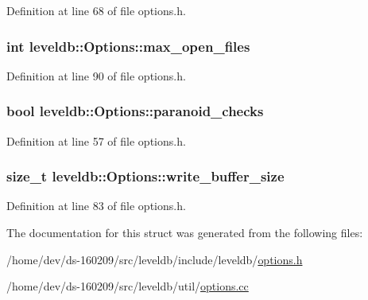 Definition at line 68 of file options.\+h.

\hypertarget{structleveldb_1_1_options_a25c6ea125fc63342d8fc25b2f7817be4}{}
\subsubsection[{max\+\_\+open\+\_\+files}]{\setlength{\rightskip}{0pt plus 5cm}int leveldb\+::\+Options\+::max\+\_\+open\+\_\+files}\label{structleveldb_1_1_options_a25c6ea125fc63342d8fc25b2f7817be4}


Definition at line 90 of file options.\+h.

\hypertarget{structleveldb_1_1_options_a4263dcc655493100eecc9daf6737a10b}{}
\subsubsection[{paranoid\+\_\+checks}]{\setlength{\rightskip}{0pt plus 5cm}bool leveldb\+::\+Options\+::paranoid\+\_\+checks}\label{structleveldb_1_1_options_a4263dcc655493100eecc9daf6737a10b}


Definition at line 57 of file options.\+h.

\hypertarget{structleveldb_1_1_options_a017f1f9558e6b3887434df29a16dac97}{}
\subsubsection[{write\+\_\+buffer\+\_\+size}]{\setlength{\rightskip}{0pt plus 5cm}size\+\_\+t leveldb\+::\+Options\+::write\+\_\+buffer\+\_\+size}\label{structleveldb_1_1_options_a017f1f9558e6b3887434df29a16dac97}


Definition at line 83 of file options.\+h.



The documentation for this struct was generated from the following files\+:\begin{DoxyCompactItemize}
\item 
/home/dev/ds-\/160209/src/leveldb/include/leveldb/\hyperlink{options_8h}{options.\+h}\item 
/home/dev/ds-\/160209/src/leveldb/util/\hyperlink{options_8cc}{options.\+cc}\end{DoxyCompactItemize}
